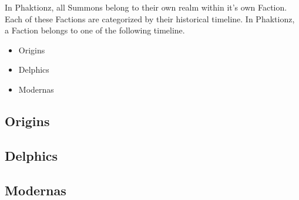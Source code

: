 In Phaktionz, all Summons belong to their own realm within it's own Faction. Each 
of these Factions are categorized by their historical timeline. In Phaktionz, a Faction 
belongs to one of the following timeline. 

\begin{itemize}
    \item Origins 
    \item Delphics
    \item Modernas
\end{itemize}

\subsection{Origins}

\newpage
\subsection{Delphics}

\newpage
\subsection{Modernas}

\newpage